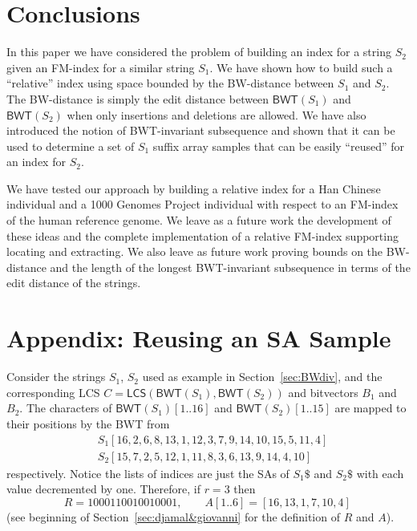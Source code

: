 \documentclass{llncs}
\newcommand{\LCS}
  {\ensuremath{\mathsf{LCS}}}
\newcommand{\BWT}
  {\ensuremath{\mathsf{BWT}}}
\begin{document}
\section{Conclusions}\label{sec:concl}



In this paper we have considered the problem of building an index for a
string $S_2$ given an FM-index for a similar string $S_1$. We have shown how
to build such a ``relative'' index using space bounded by the BW-distance
between $S_1$ and $S_2$. The BW-distance is simply the edit distance between
$\BWT(S_1)$ and $\BWT(S_2)$ when only insertions and deletions are allowed.
We have also introduced the notion of BWT-invariant subsequence and shown
that it can be used to determine a set of $S_1$ suffix array samples that can
be easily ``reused'' for an index for $S_2$.

We have tested our approach by building a relative index for a Han Chinese
individual and a 1000 Genomes Project individual with respect to an FM-index
of the human reference genome. We leave as a future work the development of
these ideas and the complete implementation of a relative FM-index supporting
locating and extracting.  We also leave as future work proving bounds on the
BW-distance and the length of the longest BWT-invariant subsequence in terms
of the edit distance of the strings.






\appendix

\section*{Appendix: Reusing an SA Sample} \label{sec:sample}

Consider the strings $S_1$, $S_2$ used as example in Section~\ref{sec:BWdiv},
and the corresponding LCS $C=\LCS(\BWT (S_1),\BWT (S_2))$ and bitvectors
$B_1$ and $B_2$. The characters of \(\BWT (S_1) [1..16]\) and \(\BWT (S_2)
[1..15]\) are mapped to their positions by the BWT from
\begin{align*}
& S_1 [16, 2, 6, 8, 13, 1, 12, 3, 7, 9, 14, 10, 15, 5, 11, 4]\\
& S_2 [15, 7, 2, 5, 12, 1, 11, 8, 3, 6, 13, 9, 14, 4, 10]
\end{align*}
respectively. Notice the lists of indices are just the SAs of $S_1\$$ and
$S_2\$$ with each value decremented by one.  Therefore, if \(r = 3\) then
$$
R = 1000110010010001, \qquad
A [1..6] = [16, 13, 1, 7, 10, 4]\,
$$
(see beginning of Section~\ref{sec:djamal&giovanni} for the definition of $R$
and $A$).
\end{document}
